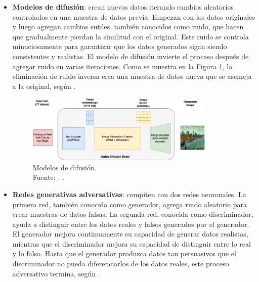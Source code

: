 \begin{itemize}
	\item \textbf{Modelos de difusión}: crean nuevos datos iterando cambios aleatorios controlados en una muestra de datos previa. Empezan con los datos originales y luego agregan cambios sutiles, también conocidos como ruido, que hacen que gradualmente pierdan la similitud con el original. Este ruido se controla minuciosamente para garantizar que los datos generados sigan siendo consistentes y realistas. El modelo de difusión invierte el proceso después de agregar ruido en varias iteraciones. Como se muestra en la Figura \ref{2:fig59}, la eliminación de ruido inversa crea una muestra de datos nueva que se asemeja a la original, según \parencite{tec_amaz2023iagen}.
	
	\begin{figure}[!ht]
		\begin{center}
			\includegraphics[width=0.85\textwidth]{2/figures/modelosdedifusion.jpg}
			\caption[Modelos de difusión]{Modelos de difusión.\\
			Fuente: \cite{tec_amaz2023iagen}. .}
			\label{2:fig59}
		\end{center}
	\end{figure}

	\item \textbf{Redes generativas adversativas}: compiten con dos redes neuronales. La primera red, también conocida como generador, agrega ruido aleatorio para crear muestras de datos falsas. La segunda red, conocida como discriminador, ayuda a distinguir entre los datos reales y falsos generados por el generador. El generador mejora continuamente su capacidad de generar datos realistas, mientras que el discriminador mejora su capacidad de distinguir entre lo real y lo falso. Hasta que el generador produzca datos tan persuasivos que el discriminador no pueda diferenciarlos de los datos reales, este proceso adversativo termina, según \parencite{tec_amaz2023iagen}.


\end{itemize}
